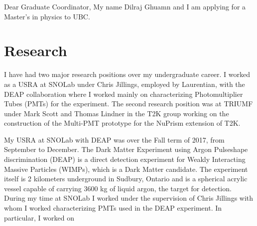 \documentclass[11pt]{article}
\begin{document}
Dear Graduate Coordinator,
My name Dilraj Ghuamn and I am applying for a Master's in physics to UBC. 
\section{Research}
I have had two major research positions over my undergraduate career. I worked as a USRA at SNOLab under Chris Jillings, employed by Laurentian, with the DEAP collaboration where I worked mainly on characterizing Photomultiplier Tubes (PMTs) for the experiment. The second research position was at TRIUMF under Mark Scott and Thomas Lindner in the T2K group working on the construction of the Multi-PMT prototype for the NuPrism extension of T2K.

My USRA at SNOLab with DEAP was over the Fall term of 2017, from September to December. The Dark Matter Experiment using Argon Pulseshape discrimination (DEAP) is a direct detection experiment for Weakly Interacting Massive Particles (WIMPs), which is a Dark Matter candidate. The experiment itself is 2 kilometers underground in Sudbury, Ontario and is a spherical acrylic vessel capable of carrying 3600 kg of liquid argon, the target for detection. During my time at SNOLab I worked under the supervision of Chris Jillings with whom I worked characterizing PMTs used in the DEAP experiment. In particular, I worked on 
\end{document}
